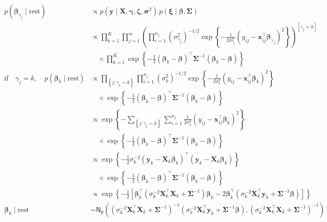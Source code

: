 \begin{appendix}
\begin{itemize}
\begin{equation}
\begin{split}
p(\bm{\beta}_{\gamma_j} \mid \text{rest}) 
&\propto p(\bm{y} \mid \bm{X}, \bm{\gamma}, \bm{\zeta}, \bm{\sigma}^2) 
\, p(\bm{\xi} \mid\bm{\beta},\bm{\Sigma}) \\
&\propto \prod_{k=1}^{K}\prod_{j=1}^{m} \left(\prod_{i=1}^{n_j} (\sigma_{\gamma_j}^2)^{-1/2} 
\exp\left\{ -\frac{1}{2\sigma_{\gamma_j}^2} (y_{ij} - \bm{x}_{ij}^\top \bm{\beta}_{\gamma_j})^2 \right\} \right)^{[\gamma_j = k]}\\ 
&\quad \times \prod_{k=1}^{K} \exp\left\{ -\frac{1}{2} (\bm{\beta}_k - \bm{\beta})^\top \bm{\Sigma}^{-1} (\bm{\beta}_k - \bm{\beta}) \right\} \\
\text{if}\quad \gamma_j = k, \quad 
p(\bm{\beta}_k \mid \text{rest}) 
&\propto \prod_{\left\lbrace j : \gamma_j = k\right\rbrace} \prod_{i=1}^{n_j} (\sigma_k^2)^{-1/2} 
\exp\left\{ -\frac{1}{2\sigma_k^2} (y_{ij} - \bm{x}_{ij}^\top \bm{\beta}_k)^2 \right\} \\
&\quad \times \exp\left\{ -\frac{1}{2} (\bm{\beta}_k - \bm{\beta})^\top \bm{\Sigma}^{-1} (\bm{\beta}_k - \bm{\beta}) \right\} \\
&\propto \exp\left\{ - \sum_{\left\lbrace j : \gamma_j=k\right\rbrace}\sum_{i=1}^{n_j}\frac{1}{2\sigma_k^2}(y_{ij} - \bm{x}_{ij}^\top \bm{\beta}_k)^2\right\} \\
&\quad \times \exp\left\{ -\frac{1}{2}(\bm{\beta}_k - \bm{\beta})^\top \bm{\Sigma}^{-1}(\bm{\beta}_k - \bm{\beta})\right\} \\
&\propto \exp \left\{ -\frac{1}{2}\sigma_k^{-2} (\bm{y}_{k}-\bm{X}_{k}\bm{\beta}_k)^\top (\bm{y}_{k}-\bm{X}_{k}\bm{\beta}_k) \right\} \\
&\quad \times \exp \left\{ -\frac{1}{2}(\bm{\beta}_k-\bm{\beta})^\top\bm{\Sigma}^{-1}(\bm{\beta}_k-\bm{\beta}) \right\} \\
&\propto \exp\left\{ -\frac{1}{2}\left[\bm{\beta}_k^\top(\sigma_k^{-2}\bm{X}_{k}^\top\bm{X}_{k}+\bm{\Sigma}^{-1})\bm{\beta}_k-2\bm{\beta}_k^\top(\sigma_k^{-2}\bm{X}_{k}^\top\bm{y}_{k}+\bm{\Sigma}^{-1}\bm{\beta})\right]\right\} \\
\bm{\beta}_k \mid \text{rest} &\sim \mathsf{N_p}\left((\sigma_k^{-2}\bm{X}_{k}^\top\bm{X}_{k}+\bm{\Sigma}^{-1})^{-1}(\sigma_k^{-2}\bm{X}_{k}^\top\bm{y}_{k}+\bm{\Sigma}^{-1}\bm{\beta}) , (\sigma_k^{-2}\bm{X}_{k}^\top\bm{X}_{k}+\bm{\Sigma}^{-1})^{-1}\right)
\end{split}
\end{equation}


\end{itemize}
\end{appendix}
